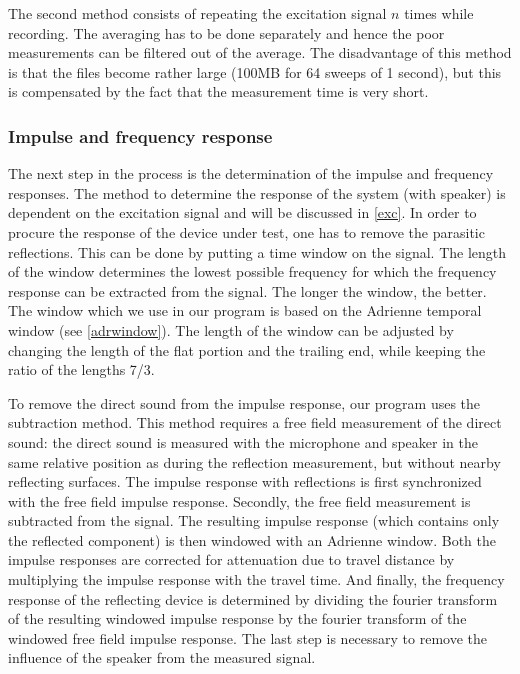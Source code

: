 The second method consists of repeating the excitation signal $n$ times while recording. The averaging has to be done separately and hence the poor  measurements can be filtered out of the average. The disadvantage of this method is that the files become rather large (100MB for 64 sweeps of 1 second), but this is compensated by the fact that the measurement time is very short.



\subsubsection*{Impulse and frequency response}
\vspace{-15pt}
The next step in the process is the determination of the impulse and frequency responses. The method to determine the response of the system (with speaker) is dependent on the excitation signal and will be discussed in \ref{exc}. In order to procure the response of the device under test, one has to remove the parasitic reflections. This can be done by putting a time window on the signal. The length of the window determines the lowest possible frequency for which the frequency response can be extracted from the signal. The longer the window, the better. The window which we use in our program is based on the Adrienne temporal window (see \ref{adrwindow}). The length of the window can be adjusted by changing the length of the flat portion and the trailing end, while keeping the ratio of the lengths 7/3.

To remove the direct sound from the impulse response, our program uses the subtraction method. This method requires a free field measurement of the direct sound: the direct sound is measured with the microphone and speaker in the same relative position as during the reflection measurement, but without nearby reflecting surfaces. The impulse response with reflections is first synchronized with the free field impulse response. Secondly, the free field measurement is subtracted from the signal. The resulting impulse response (which contains only the reflected component) is then windowed with an Adrienne window. Both the impulse responses are corrected for attenuation due to travel distance by multiplying the impulse response with the travel time. And finally, the frequency response of the reflecting device is determined by dividing the fourier transform of the resulting windowed impulse response by the fourier transform of the windowed free field impulse response. The last step is necessary to remove the influence of the speaker from the measured signal.



